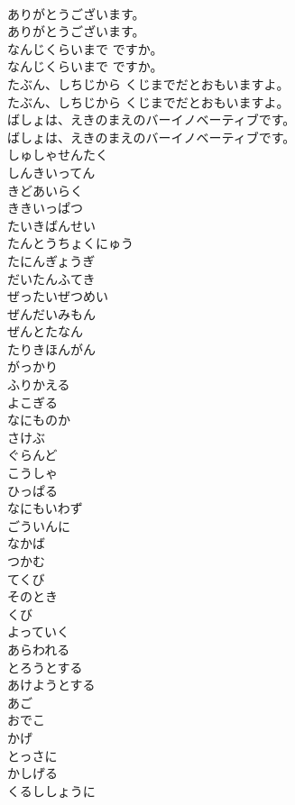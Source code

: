 \documentclass[8pt]{extreport}
\begin{document}
\begin{CJK}{UTF8}{min}
\\	ありがとうございます。
\\	ありがとうございます。
\\	なんじくらいまで ですか。
\\	なんじくらいまで ですか。
\\	たぶん、しちじから くじまでだとおもいますよ。
\\	たぶん、しちじから くじまでだとおもいますよ。
\\	ばしょは、えきのまえのバーイノベーティブです。
\\	ばしょは、えきのまえのバーイノベーティブです。
\\	しゅしゃせんたく
\\	しんきいってん
\\	きどあいらく
\\	ききいっぱつ
\\	たいきばんせい
\\	たんとうちょくにゅう
\\	たにんぎょうぎ
\\	だいたんふてき
\\	ぜったいぜつめい
\\	ぜんだいみもん
\\	ぜんとたなん
\\	たりきほんがん
\\	がっかり
\\	ふりかえる
\\	よこぎる
\\	なにものか
\\	さけぶ
\\	ぐらんど
\\	こうしゃ
\\	ひっぱる
\\	なにもいわず
\\	ごういんに
\\	なかば
\\	つかむ
\\	てくび
\\	そのとき
\\	くび
\\	よっていく
\\	あらわれる
\\	とろうとする
\\	あけようとする
\\	あご
\\	おでこ
\\	かげ
\\	とっさに
\\	かしげる
\\	くるししょうに

\end{CJK}
\end{document}
